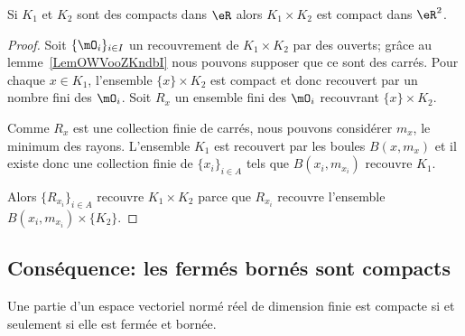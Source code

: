 \begin{lemma}\label{LemCKBooXkwkte}
	Si \( K_1\) et \( K_2\) sont des compacts dans \( \eR\) alors \( K_1\times K_2\) est compact dans \( \eR^2\).
\end{lemma}

\begin{proof}
	Soit \( \{ \mO_i \}_{i\in I}\) un recouvrement de \( K_1\times K_2\) par des ouverts; grâce au lemme~\ref{LemOWVooZKndbI} nous pouvons supposer que ce sont des carrés. Pour chaque \( x\in K_1\), l'ensemble \( \{ x \}\times K_2\) est compact et donc recouvert par un nombre fini des \( \mO_i\). Soit \( R_x\) un ensemble fini des \( \mO_i\) recouvrant \( \{ x \}\times K_2\).

	Comme \( R_x\) est une collection finie de carrés, nous pouvons considérer \( m_x\), le minimum des rayons. L'ensemble \( K_1\) est recouvert par les boules \( B(x,m_x)\) et il existe donc une collection finie de \( \{ x_i \}_{i\in A}\) tels que \( B(x_i,m_{x_i})\) recouvre \( K_1\).

	Alors \( \{ R_{x_i} \}_{i\in A}\) recouvre \( K_1\times K_2\) parce que \( R_{x_i}\) recouvre l'ensemble \( B(x_i,m_{x_i})\times \{ K_2 \}\).
\end{proof}

\subsection{Conséquence: les fermés bornés sont compacts}

\begin{theorem} \label{ThoXTEooxFmdI}
	Une partie d'un espace vectoriel normé réel de dimension finie est compacte si et seulement si elle est fermée et bornée.
\end{theorem}


